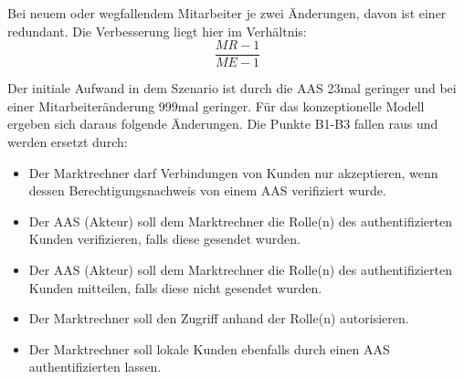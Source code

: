 \documentclass[11pt,a4paper]{report}
\begin{document}
Bei neuem oder wegfallendem Mitarbeiter je zwei Änderungen, davon ist einer redundant. Die Verbesserung liegt hier im Verhältnis:
\[
	\frac{MR-1}{ME-1}
\]

Der initiale Aufwand in dem Szenario ist durch die AAS 23mal geringer und bei einer Mitarbeiteränderung 999mal geringer. Für das konzeptionelle Modell ergeben sich daraus folgende Änderungen. Die Punkte B1-B3 fallen raus und werden ersetzt durch:

\begin{itemize}[leftmargin=*]
\item Der Marktrechner darf Verbindungen von Kunden nur akzeptieren, wenn dessen Berechtigungsnachweis von einem AAS verifiziert wurde.
\item Der AAS (Akteur) soll dem Marktrechner die Rolle(n) des authentifizierten Kunden verifizieren, falls diese gesendet wurden.
\item Der AAS (Akteur) soll dem Marktrechner die Rolle(n) des authentifizierten Kunden mitteilen, falls diese nicht gesendet wurden.
\item Der Marktrechner soll den Zugriff anhand der Rolle(n) autorisieren.
\item Der Marktrechner soll lokale Kunden ebenfalls durch einen AAS authentifizierten lassen.
\end{itemize}
\end{document}
